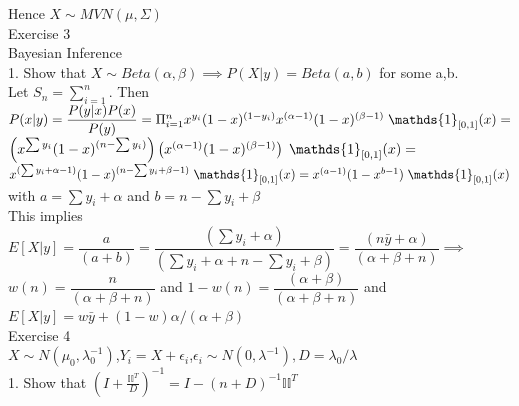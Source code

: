 \documentclass[18pt]{article}
\begin{document}
\begin{flushleft}
\vspace{.4cm}
Hence $X \sim MVN(\mu,\Sigma)$\\
\pagebreak
Exercise 3\\
\vspace{.4cm}
Bayesian Inference\\
\vspace{.4cm}
1. Show that $X \sim Beta(\alpha,\beta) \implies P(X|y)= Beta(a,b)$ for some a,b.\\
Let $S_n=\sum\limits_{i=1}^{n}$. Then\\
\vspace{.4cm}
$P(x|y)=\dfrac{P(y|x)P(x)}{P(y)}=\Pi_{i=1}^{n} x^{y_i}(1-x)^{(1-y_i)} x^{(\alpha-1)} (1-x)^{(\beta-1)}\hspace{.1cm}{\mathds{1}}_{[0,1]} (x)=$\\
$\left(x^{\sum y_i} (1-x)^{(n-\sum y_i)}\right) \left(x^{(\alpha-1)} (1-x)^{(\beta-1)}\right)\hspace{.1cm}{\mathds{1}}_{[0,1]} (x)=$\\
$x^{(\sum y_i+\alpha-1)} (1-x)^{(n-\sum y_i+\beta-1)}\hspace{.1cm}{\mathds{1}}_{[0,1]} (x)=x^{(a-1)} (1-x^{b-1})\hspace{.1cm}{\mathds{1}}_{[0,1]} (x)$ with $a=\sum y_i+\alpha$ and $b=n-\sum y_i+\beta$\\
\vspace{.4cm}
This implies\\
\vspace{.4cm}
$E[X|y]=\dfrac{a}{(a+b)}=\dfrac{(\sum y_i+\alpha)}{(\sum y_i+\alpha+n-\sum y_i+\beta)}=\dfrac{(n \bar{y}+\alpha)}{(\alpha+\beta+n)} \implies$\\
\vspace{.4cm}
$w(n)=\dfrac{n}{(\alpha+\beta+n)}$ and $1-w(n)=\dfrac{(\alpha+\beta)}{(\alpha+\beta+n)}$ and \\
\vspace{.4cm}
$E[X|y]=w\bar{y}+(1-w)\alpha /(\alpha+\beta)$\\
\vspace{.4cm}
Exercise 4\\
\vspace{.4cm}
$X \sim N(\mu_0,\lambda_0^{-1})$,$Y_i=X+\epsilon_i$,$\epsilon_i \sim N(0,\lambda^{-1}), D=\lambda_0/\lambda$\\
\vspace{.4cm}
1. Show that $\left( I+\frac{\mathbb{I}\mathbb{I}^T}{D} \right)^{-1}=I-\left(n+D\right)^{-1}\mathbb{I}\mathbb{I}^T$\\
\vspace{.4cm}

\end{flushleft}
\end{document}
